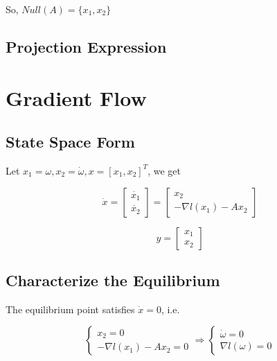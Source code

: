 \documentclass{article}
\begin{document}
So, $Null(A)=\{x_1,x_2\}$

\subsection{Projection Expression}

\section{Gradient Flow}

\subsection{State Space Form}

Let $x_1=\omega, x_2=\dot{\omega}, x=[x_1,x_2]^T$, we get

\begin{equation}
    \dot{x}=
    \begin{bmatrix}
        \dot{x_1}\\\dot{x_2}
    \end{bmatrix}
    =\begin{bmatrix}
        x_2\\-\nabla l(x_1)-Ax_2
    \end{bmatrix}
\end{equation}

\begin{equation}
    y=
    \begin{bmatrix}
        x_1\\x_2
    \end{bmatrix}
\end{equation}

\subsection{Characterize the Equilibrium}

The equilibrium point satisfies $\dot{x}=0$, i.e.

\begin{equation}
    \begin{cases}
        x_2=0\\
        -\nabla l(x_1)-Ax_2=0
    \end{cases}
    \Rightarrow
    \begin{cases}
        \dot{\omega}=0\\
        \nabla l(\omega)=0
    \end{cases}
\end{equation}
\end{document}
